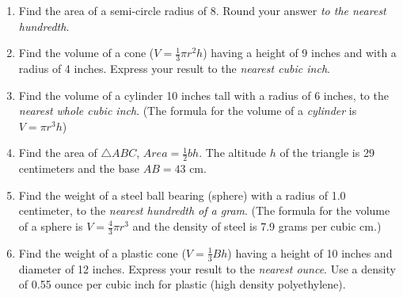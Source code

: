 \documentclass[12pt, twoside]{article}
\begin{document}
  \begin{enumerate}

    \item Find the area of a semi-circle radius of 8. Round your answer \emph{to the nearest hundredth}.\vspace{3cm}

    \item Find the volume of a cone ($V=\frac{1}{3}\pi r^2 h$) having a height of 9 inches and with a radius of 4 inches. Express your result to the \emph{nearest cubic inch}. \vspace{7cm}

    \item Find the volume of a cylinder 10 inches tall with a radius of 6 inches, to the \emph{nearest whole cubic inch}. (The formula for the volume of a \emph{cylinder} is $V=\pi r^3h$)  \vspace{5cm}

\newpage

    \item Find the area of $\triangle ABC$,  $Area= \frac{1}{2}bh$. The altitude $h$ of the triangle is 29 centimeters and the base $AB=43$ cm.\\[0.5cm]
     \vspace{1.0cm}


   \item Find the weight of a steel ball bearing (sphere) with a radius of 1.0 centimeter, to the \emph{nearest hundredth of a gram}. (The formula for the volume of a sphere is $V=\frac{4}{3}\pi r^3$ and the density of steel is 7.9 grams per cubic cm.)  \vspace{6cm}


   \item Find the weight of a plastic cone ($V=\frac{1}{3}Bh$) having a height of 10 inches and diameter of 12 inches. Express your result to the \emph{nearest ounce}. Use a density of 0.55 ounce per cubic inch for plastic (high density polyethylene).


   \newpage


\end{enumerate}
\end{document}
